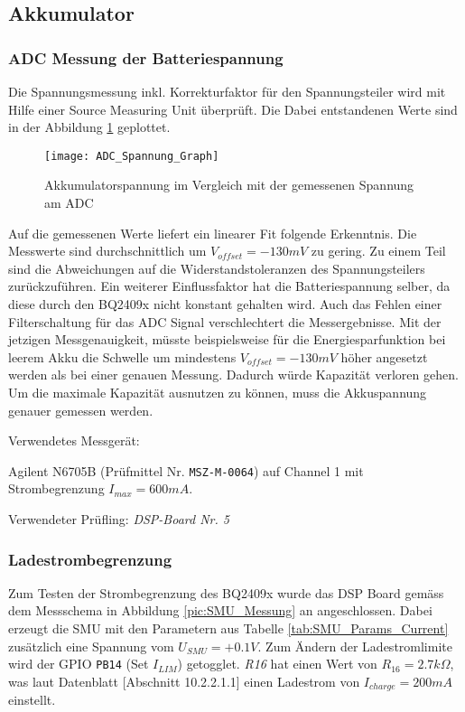 \subsection{Akkumulator}
\label{sec:Valid_Batterie}

\subsubsection{ADC Messung der Batteriespannung}

Die Spannungsmessung inkl. Korrekturfaktor für den Spannungsteiler wird mit Hilfe einer Source Measuring Unit überprüft. Die Dabei entstandenen Werte sind in der Abbildung \ref{pic:ADC_Spannung_Graph} geplottet.

\begin{figure}[H]
	\centering
	\texttt{[image: ADC\_Spannung\_Graph]}
	\caption{Akkumulatorspannung im Vergleich mit der gemessenen Spannung am ADC}
	\label{pic:ADC_Spannung_Graph}
\end{figure}

Auf die gemessenen Werte liefert ein linearer Fit folgende Erkenntnis.
Die Messwerte sind durchschnittlich um $V_{offset}=-130\si{mV}$ zu gering.
Zu einem Teil sind die Abweichungen auf die Widerstandstoleranzen des Spannungsteilers zurückzuführen.
Ein weiterer Einflussfaktor hat die Batteriespannung selber, da diese durch den BQ2409x nicht konstant gehalten wird. Auch das Fehlen einer Filterschaltung für das ADC Signal verschlechtert die Messergebnisse.
Mit der jetzigen Messgenauigkeit, müsste beispielsweise für die Energiesparfunktion bei leerem Akku die Schwelle um mindestens $V_{offset}=-130\si{mV}$ höher angesetzt werden als bei einer genauen Messung. Dadurch würde Kapazität verloren gehen. Um die maximale Kapazität ausnutzen zu können, muss die Akkuspannung genauer gemessen werden.

Verwendetes Messgerät:

Agilent N6705B (Prüfmittel Nr. \texttt{MSZ-M-0064}) auf Channel 1 mit Strombegrenzung $I_{max}=600\si{mA}$.

Verwendeter Prüfling: \textit{DSP-Board Nr. 5}

\subsubsection{Ladestrombegrenzung}
\label{sec:Valid_Ladestrom}

Zum Testen der Strombegrenzung des BQ2409x wurde das DSP Board gemäss dem Messschema in Abbildung \ref{pic:SMU_Messung} an angeschlossen.
Dabei erzeugt die SMU mit den Parametern aus Tabelle \ref{tab:SMU_Params_Current} zusätzlich eine Spannung vom $U_{SMU}=+0.1\si{V}$.
Zum Ändern der Ladestromlimite wird der GPIO \texttt{PB14} (Set $I_{LIM}$) getogglet.
\textit{R16} hat einen Wert von $R_{16}=2.7k\Omega$, was laut Datenblatt \cite{bq2409x}[Abschnitt 10.2.2.1.1] einen Ladestrom von $I_{charge}=200\si{mA}$ einstellt.

